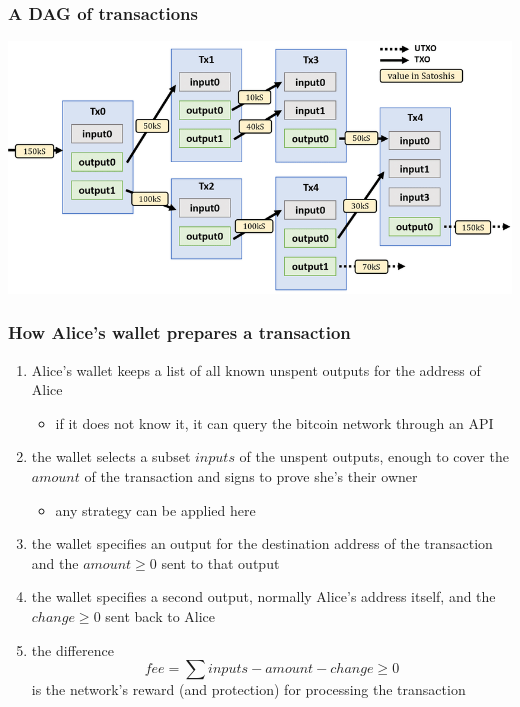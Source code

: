 \documentclass[11pt]{beamer}  %
\begin{document}
\begin{frame}\frametitle{A DAG of transactions}

  \begin{center}
    \includegraphics[width=\textwidth,clip=false]{pictures/bitcoin-dag.png}
  \end{center}

\end{frame}

\begin{frame}\frametitle{How Alice's wallet prepares a transaction}

  \begin{enumerate}
  \item Alice's wallet keeps a list of all known unspent outputs for the address
    of Alice
    \begin{itemize}
    \item if it does not know it, it can query the bitcoin network through an API
    \end{itemize}
  \item the wallet selects a subset $\mathit{inputs}$ of the unspent outputs, enough to cover
    the $\mathit{amount}$ of the transaction and signs to prove she's their owner
    \begin{itemize}
    \item any strategy can be applied here
    \end{itemize}
  \item the wallet specifies an output for the destination address of the transaction
    and the $\mathit{amount}\ge 0$ sent to that output
  \item the wallet specifies a second output, normally Alice's address itself, and the
    $\mathit{change}\ge 0$ sent back to Alice
  \item the difference
    \[
    \mathit{fee}=\sum\mathit{inputs}-\mathit{amount}-\mathit{change}\ge 0
    \]
    is the network's reward (and protection) for processing the transaction
  \end{enumerate}

\end{frame}
\end{document}
